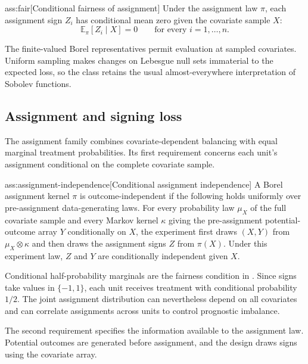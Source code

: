 \documentclass[11pt]{article}
\begin{document}
\begin{assumptionv}{ass:fair}[Conditional fairness of assignment]
Under the assignment law \(\pi\), each assignment sign \(Z_i\) has conditional mean zero given the covariate sample \(X\):
\[
\mathbb E_\pi[Z_i\mid X]=0
\qquad\text{for every }i=1,\ldots,n.
\]
\end{assumptionv}

The finite-valued Borel representatives permit evaluation at sampled covariates. Uniform sampling makes changes on Lebesgue null sets immaterial to the expected loss, so the class retains the usual almost-everywhere interpretation of Sobolev functions.

\subsection{Assignment and signing loss}

The assignment family combines covariate-dependent balancing with equal marginal treatment probabilities. Its first requirement concerns each unit's assignment conditional on the complete covariate sample.

\begin{assumptionv}{ass:assignment-independence}[Conditional assignment independence]
A Borel assignment kernel \(\pi\) is outcome-independent if the following holds uniformly over pre-assignment data-generating laws. For every probability law \(\mu_X\) of the full covariate sample and every Markov kernel \(\kappa\) giving the pre-assignment potential-outcome array \(Y\) conditionally on \(X\), the experiment first draws \((X,Y)\) from \(\mu_X\otimes\kappa\) and then draws the assignment signs \(Z\) from \(\pi(X)\). Under this experiment law, \(Z\) and \(Y\) are conditionally independent given \(X\).
\end{assumptionv}

Conditional half-probability marginals are the fairness condition in \citep[Definition 2.2]{Cytrynbaum2026Limits}. Since signs take values in \(\{-1,1\}\), each unit receives treatment with conditional probability \(1/2\). The joint assignment distribution can nevertheless depend on all covariates and can correlate assignments across units to control prognostic imbalance.

The second requirement specifies the information available to the assignment law. Potential outcomes are generated before assignment, and the design draws signs using the covariate array.
\end{document}

